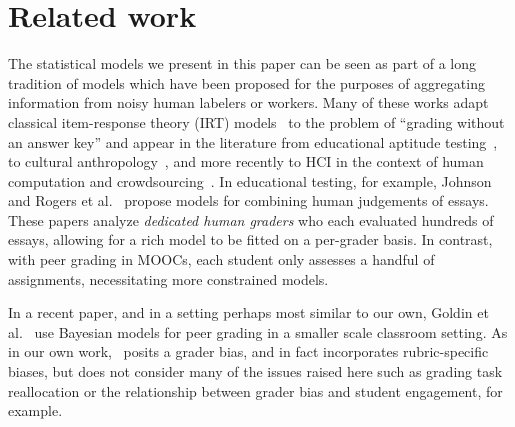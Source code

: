 \section{Related work}\label{sec:relatedwork}
The statistical models we present in this paper can be seen as part of a long tradition of models which have been proposed for the purposes of aggregating information from noisy human labelers or workers.
Many of these works adapt classical item-response theory (IRT) models~\cite{baker01} to the problem of
``grading without an answer key'' and appear in the literature from educational aptitude testing~\cite{johnson96,rogers10,mislevy99}, to
cultural anthropology~\cite{batchelder88,karabatsos03}, and more recently to HCI in the context of human computation and crowdsourcing~\cite{whitehill09}.
In educational testing, for example, Johnson~\cite{johnson96} and Rogers et al.~\cite{rogers10}
propose models for combining human judgements of essays.  %
These papers analyze \emph{dedicated human graders} who each evaluated hundreds
of essays, allowing for a rich model to be fitted on a per-grader basis.  In contrast, with peer
grading in MOOCs, each student only assesses a handful of assignments, necessitating more constrained models.







In a recent paper, and in a setting perhaps most similar to our
own, Goldin et al.~\cite{goldin11,ashley11,goldin12} use Bayesian models for peer grading in a smaller scale classroom setting. As in our
own work,~\cite{goldin12} posits a grader bias, and in fact incorporates
rubric-specific biases, but does not consider many of the
issues raised here such as grading task reallocation or the
relationship between grader bias and student engagement,
for example.

